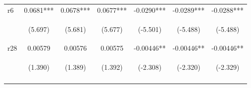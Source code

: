 \documentclass[]{article}
\begin{document}
\begin{center}
\begin{tabular}{lcccccc}
r6 & 0.0681*** & 0.0678*** & 0.0677*** & -0.0290*** & -0.0289*** & -0.0288*** \\
\vspace{4pt} & \begin{footnotesize}(5.697)\end{footnotesize} & \begin{footnotesize}(5.681)\end{footnotesize} & \begin{footnotesize}(5.677)\end{footnotesize} & \begin{footnotesize}(-5.501)\end{footnotesize} & \begin{footnotesize}(-5.488)\end{footnotesize} & \begin{footnotesize}(-5.488)\end{footnotesize} \\
r28 & 0.00579 & 0.00576 & 0.00575 & -0.00446** & -0.00446** & -0.00446** \\
 & \begin{footnotesize}(1.390)\end{footnotesize} & \begin{footnotesize}(1.389)\end{footnotesize} & \begin{footnotesize}(1.392)\end{footnotesize} & \begin{footnotesize}(-2.308)\end{footnotesize} & \begin{footnotesize}(-2.320)\end{footnotesize} & \begin{footnotesize}(-2.329)\end{footnotesize} \\
\vspace{4pt} & \begin{footnotesize}\end{footnotesize} & \begin{footnotesize}\end{footnotesize} & \begin{footnotesize}\end{footnotesize} & \begin{footnotesize}\end{footnotesize} & \begin{footnotesize}\end{footnotesize} & \begin{footnotesize}\end{footnotesize} \\

\end{tabular}
\end{center}
\end{document}
